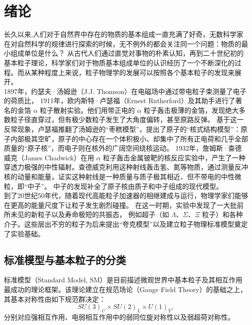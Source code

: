 \chapter{绪论}
\label{chap01}

长久以来,人们对于自然界中存在的物质的基本组成一直充满了好奇，无数科学家在对自然科学的规律进行探索的时候，无不例外的都会关注同一个问题：物质的最小组成单位是什么？
从古代人们通过直觉对事物的朴素认知，再到二十世纪初的基本粒子理论，科学家们对于物质基本组成单位的认识经历了一个不断深化的过程。而从某种程度上来说，粒子物理学的发展可以按照各个基本粒子的发现来展开。\\

1897年，约瑟夫·汤姆逊（J.J. Thomson）在电磁场中通过带电粒子束测量了电子的荷质比，
1911年，欧内斯特·卢瑟福（Ernest Rutherford）及其助手进行了著名的金箔 $\alpha$ 粒子散射实验。他们用带正电的 $\alpha$ 粒子轰击极薄的金箔，发现绝大多数粒子径直穿过，但有极少数粒子发生了大角度偏转，甚至原路反弹。
基于这一反常现象，卢瑟福推翻了汤姆逊的“枣糕模型”，提出了原子的“核式结构模型”：原子内部极其空旷，原子的中心存在一个体积极小、却集中了所有正电荷和几乎全部质量的“原子核”，而电子则在核外的广阔空间绕核运动。
1932年，詹姆斯·查德威克（James Chadwick）在用 $\alpha$ 粒子轰击金属铍靶的核反应实验中，产生了一种穿透力极强的中性辐射。查德威克利用这种射线轰击氢、氮等物质，通过测量反冲核的动量和能量，证实这种射线是一种质量与质子极其相近、但不带电的中性微粒，即“中子”。
中子的发现补全了原子核由质子和中子组成的现代模型。\\

到了20世纪50年代，随着现代高能粒子加速器的相继建成与运行，物理学家们能够在更高的能量尺度下让粒子发生剧烈碰撞。
在这一时期，实验中发现了一大批前所未见的新粒子以及寿命极短的共振态，
例如超子（如 $\Lambda$、$\Sigma$、$\Xi$ 粒子）和各种介子。这些层出不穷的粒子为后来提出“夸克模型”以及建立粒子物理标准模型奠定了实验基础。

\section{标准模型与基本粒子的分类}

标准模型（Standard Model, SM）是目前描述微观世界中基本粒子及其相互作用最成功的理论框架。该理论建立在规范场论（Gauge Field Theory）的基础之上，其基本对称性由如下规范群决定：
\begin{equation}
SU(3)_C \times SU(2)_L \times U(1)_Y ,
\end{equation}
分别对应强相互作用、电弱相互作用中的弱同位旋对称性以及弱超荷对称性。\\

